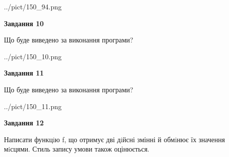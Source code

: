 \documentclass[12pt, ukrainian]{article}
\begin{document}
{\begin {large}
\begin{center}
	{../pict/150_94.png}
\end{center}
\newpage

{\begin {center}\textbf{Завдання 10}\end {center}}

Що буде виведено за виконання програми?\par
\begin{center}
	{../pict/150_10.png}
\end{center}
\newpage

{\begin {center}\textbf{Завдання 11}\end {center}}

Що буде виведено за виконання програми?\par
\begin{center}
	{../pict/150_11.png}
\end{center}
\newpage

{\begin {center}\textbf{Завдання 12}\end {center}}


Написати функцiю f, що отримує дві дiйсні змінні й обмiнює їх значення мiсцями. Стиль запису умови також оцінюється.\par
\newpage

\end {large}}
\end{document}
